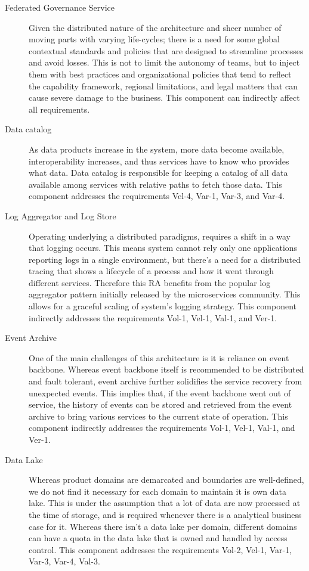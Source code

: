 \documentclass[a4paper,11pt]{article}
\begin{document}
\begin{description}
    \item[Federated Governance Service] Given the distributed nature of the architecture and sheer number of moving parts with varying life-cycles; there is a need for some global contextual standards and policies that are designed to streamline processes and avoid losses. This is not to limit the autonomy of teams, but to inject them with best practices and organizational policies that tend to reflect the capability framework, regional limitations, and legal matters that can cause severe damage to the business. This component can indirectly affect all requirements.
    
    \item[Data catalog] As data products increase in the system, more data become available, interoperability increases, and thus services have to know who provides what data. Data catalog is responsible for keeping a catalog of all data available among services with relative paths to fetch those data. This component addresses the requirements Vel-4, Var-1, Var-3, and Var-4.

    \item[Log Aggregator and Log Store] Operating underlying a distributed paradigms, requires a shift in a way that logging occurs. This means system cannot rely only one applications reporting logs in a single environment, but there's a need for a distributed tracing that shows a lifecycle of a process and how it went through different services. Therefore this RA benefits from the popular log aggregator pattern initially released by the microservices community. This allows for a graceful scaling of system's logging strategy. This component indirectly addresses the requirements Vol-1, Vel-1, Val-1, and Ver-1. 
    
    \item[Event Archive] One of the main challenges of this architecture is it is reliance on event backbone. Whereas event backbone itself is recommended to be distributed and fault tolerant, event archive further solidifies the service recovery from unexpected events. This implies that, if the event backbone went out of service, the history of events can be stored and retrieved from the event archive to bring various services to the current state of operation. This component indirectly addresses the requirements Vol-1, Vel-1, Val-1, and Ver-1. 

    \item[Data Lake] Whereas product domains are demarcated and boundaries are well-defined, we do not find it necessary for each domain to maintain it is own data lake. This is under the assumption that a lot of data are now processed at the time of storage, and is required whenever there is a analytical business case for it. Whereas there isn't a data lake per domain, different domains can have a quota in the data lake that is owned and handled by access control. This component addresses the requirements Vol-2, Vel-1, Var-1, Var-3, Var-4, Val-3.
    

\end{description}
\end{document}
